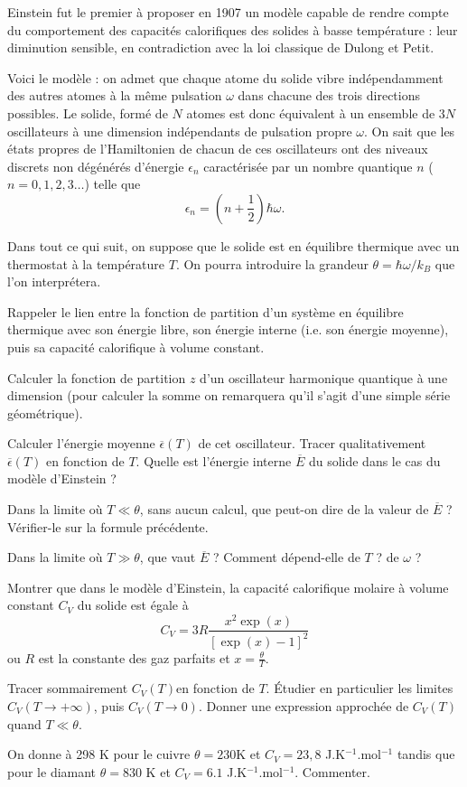 Einstein fut le premier à proposer en 1907 un modèle capable de rendre compte du comportement des capacités calorifiques des solides à basse température : leur diminution sensible, en contradiction avec la loi classique de Dulong et Petit.

Voici le modèle : on admet que chaque atome du solide vibre indépendamment des autres atomes à la même pulsation $\omega $ dans chacune des trois directions possibles. Le solide, formé de $N$ atomes est donc équivalent à un ensemble de
$3N$ oscillateurs à une dimension indépendants de pulsation propre $\omega$. On sait que les états propres de l'Hamiltonien de chacun de ces oscillateurs ont des niveaux discrets non dégénérés d'énergie $\epsilon_n$ caractérisée par un nombre quantique $n$ ($n=0,1,2,3\ldots$) telle que
$$
  \epsilon_n=(n+\frac{1}{2}) \hbar \omega.
$$

Dans tout ce qui suit, on suppose que le solide est en équilibre thermique avec un thermostat à la température $T$. On pourra introduire la grandeur $\theta=\hbar \omega/k_B$ que l'on interprétera.

\question
Rappeler le lien entre la fonction de partition d'un système en équilibre thermique avec son énergie libre, son énergie interne (i.e. son énergie moyenne), puis sa capacité calorifique à volume constant.

\question Calculer la fonction de partition $z$ d'un oscillateur harmonique quantique à une dimension (pour calculer la somme on remarquera qu'il s'agit d'une simple série géométrique).

\question Calculer l'énergie moyenne $\overline \epsilon (T)$ de cet oscillateur. Tracer qualitativement $\overline \epsilon (T)$ en fonction de $T$. Quelle est l'énergie interne $\overline E$ du solide dans le cas du modèle d'Einstein ?

\question Dans la limite où $T \ll \theta$, sans aucun calcul, que peut-on dire de la valeur de $\overline E$ ? Vérifier-le sur la formule précédente.

\question Dans la limite où $T \gg \theta$, que vaut $\overline E$ ? Comment dépend-elle de $T$ ? de $\omega $ ? 

\question Montrer que dans le modèle d'Einstein, la capacité calorifique molaire à volume constant $C_V$ du solide est égale à
$$
 C_V=3R \frac{x^2 \exp ( x)}{[\exp (x)-1]^2}
$$
ou $R$ est la constante des gaz parfaits et $\displaystyle{x=\frac{\theta}{T}}$.

\question
Tracer sommairement $C_V(T)$en fonction de $T$. \'Etudier en particulier les limites $C_V(T \to + \infty)$, puis $C_V(T \to 0)$. Donner une expression approchée de $C_V(T)$ quand $T \ll \theta$.

\question
On donne à 298 K pour le cuivre $\theta=230$K et $C_V=23,8$ J.K$^{-1}$.mol$^{-1}$ tandis que pour le diamant $\theta=830$ K et $C_V=6.1$ J.K$^{-1}$.mol$^{-1}$. Commenter.

